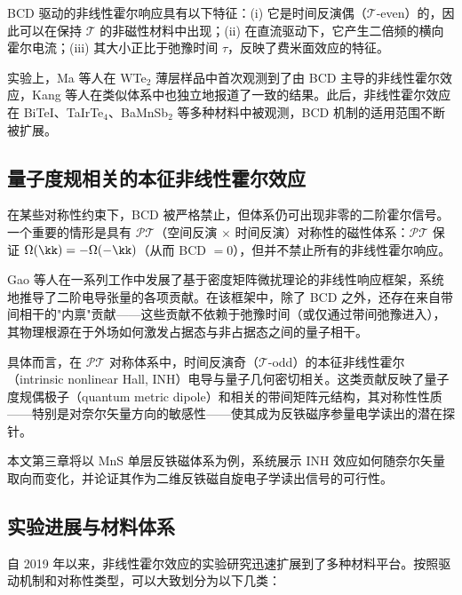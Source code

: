 BCD 驱动的非线性霍尔响应具有以下特征：(i) 它是时间反演偶（$\mathcal{T}$-even）的，因此可以在保持 $\mathcal{T}$ 的非磁性材料中出现；(ii) 在直流驱动下，它产生二倍频的横向霍尔电流；(iii) 其大小正比于弛豫时间 $\tau$，反映了费米面效应的特征。

实验上，Ma 等人在 WTe$_2$ 薄层样品中首次观测到了由 BCD 主导的非线性霍尔效应\cite{ma2019observation}，Kang 等人在类似体系中也独立地报道了一致的结果\cite{kang2019nonlinear}。此后，非线性霍尔效应在 BiTeI、TaIrTe$_4$、BaMnSb$_2$ 等多种材料中被观测\cite{Kumar2021_TaIrTe4,he2021quantum}，BCD 机制的适用范围不断被扩展。

\subsection{量子度规相关的本征非线性霍尔效应}
\label{subsec:inh}

在某些对称性约束下，BCD 被严格禁止，但体系仍可出现非零的二阶霍尔信号。一个重要的情形是具有 $\mathcal{PT}$（空间反演 $\times$ 时间反演）对称性的磁性体系：$\mathcal{PT}$ 保证 $\Omega(\kk) = -\Omega(-\kk)$（从而 BCD $= 0$），但并不禁止所有的非线性霍尔响应。

Gao 等人在一系列工作中\cite{gao_field_2014,gao_orbital_2018}发展了基于密度矩阵微扰理论的非线性响应框架，系统地推导了二阶电导张量的各项贡献。在该框架中，除了 BCD 之外，还存在来自带间相干的"内禀"贡献——这些贡献不依赖于弛豫时间（或仅通过带间弛豫进入），其物理根源在于外场如何激发占据态与非占据态之间的量子相干。

具体而言，在 $\mathcal{PT}$ 对称体系中，时间反演奇（$\mathcal{T}$-odd）的本征非线性霍尔（intrinsic nonlinear Hall, INH）电导与量子几何密切相关。这类贡献反映了量子度规偶极子（quantum metric dipole）和相关的带间矩阵元结构，其对称性性质——特别是对奈尔矢量方向的敏感性——使其成为反铁磁序参量电学读出的潜在探针。

本文第三章将以 MnS 单层反铁磁体系为例，系统展示 INH 效应如何随奈尔矢量取向而变化，并论证其作为二维反铁磁自旋电子学读出信号的可行性。

\subsection{实验进展与材料体系}

自 2019 年以来，非线性霍尔效应的实验研究迅速扩展到了多种材料平台。按照驱动机制和对称性类型，可以大致划分为以下几类：

